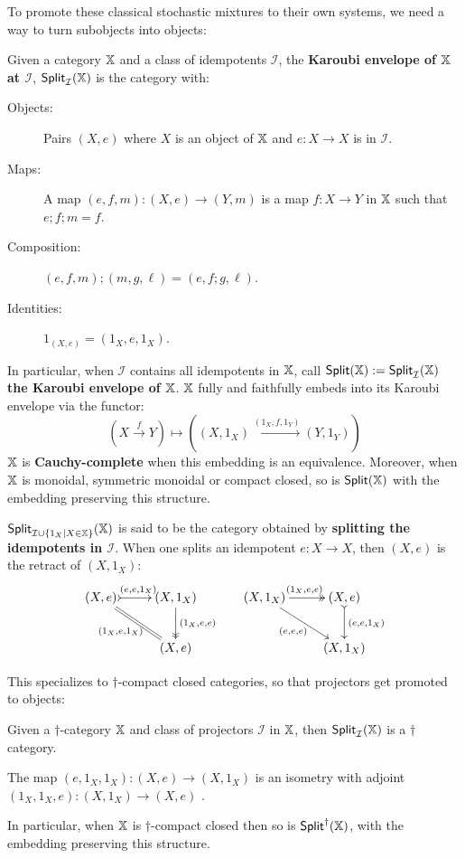 To promote these classical stochastic mixtures to their own systems, we need a way to turn subobjects into objects:
\begin{definition}
Given a category $\mathbb{X}$ and a class of idempotents $\mathcal I$, the {\bf Karoubi envelope of $\mathbb{X}$ at $\mathcal{I}$}, ${\sf Split}_{\mathcal I}(\mathbb{X})$ is the category with:
\begin{description}
\item[Objects:] Pairs $(X,e)$ where $X$ is an object of $\mathbb{X}$ and $e:X\to X$ is in $\mathcal I$.
\item[Maps:] A map $(e,f,m):(X,e)\to (Y,m)$ is a map $f:X\to Y$ in $\mathbb{X}$ such that $e;f;m=f$.
\item[Composition:] $(e,f,m);(m,g,\ell) = (e,f;g,\ell)$.
\item[Identities:] $1_{(X,e)}=(1_X,e,1_X)$.
\end{description}
In particular, when $\mathcal{I}$ contains all idempotents in $\mathbb{X}$, call  ${\sf Split}(\mathbb{X}):={\sf Split}_{\mathcal I}(\mathbb{X})$ {\bf the Karoubi envelope of $\mathbb{X}$}.
$\mathbb{X}$ fully and faithfully embeds into its Karoubi envelope via the functor:
$$
\left(X\xrightarrow{f}Y\right)
\mapsto 
\left((X,1_X)\xrightarrow{(1_X,f,1_Y)}(Y,1_Y)\right)
$$
$\mathbb{X}$ is {\bf Cauchy-complete} when this embedding is an equivalence. 
Moreover, when $\mathbb{X}$ is monoidal, symmetric monoidal or compact closed, so is ${\sf Split}(\mathbb{X})$ with the embedding preserving this structure.


${\sf Split}_{{\mathcal I }\cup \{ 1_X | X \in \mathbb{X}\}}(\mathbb{X})$ is said to be the category obtained by {\bf splitting the idempotents in $\mathcal I$}.
When one splits an idempotent $e:X\to X$, then $(X,e)$ is the retract of $(X, 1_X)$:
$$
\xymatrix{
(X,e) \ar@{>->}[r]^{(e,e,1_X)} \ar@{=}[dr]_{(1_X,e,1_X)} & (X,1_X)  \ar@{->>}[d]^{(1_X,e,e)}\\
& (X,e)
}\, \hspace*{.5cm}
\xymatrix{
(X,1_X) \ar@{->>}[r]^{(1_X,e,e)} \ar[dr]_{(e,e,e)} & (X,e)  \ar@{>->}[d]^{(e,e,1_X)}\\
& (X,1_X)
}
$$
\end{definition}
This specializes to $\dag$-compact closed categories, so that projectors get promoted to objects:
\begin{definition}
Given a $\dag$-category $\mathbb{X}$ and class of projectors $\mathcal I$ in $\mathbb{X}$, then  ${\sf Split}_{\mathcal I}(\mathbb{X})$ is a $\dag$ category.

The map $(e,1_X, 1_X) :(X,e)\to (X,1_X)$ is an isometry with adjoint $(1_X,1_X, e) :(X,1_X)\to (X,e)$ .

In particular, when $\mathbb{X}$ is $\dag$-compact closed then so is ${\sf Split}^\dag(\mathbb{X})$, with the embedding preserving this structure.
\end{definition}
